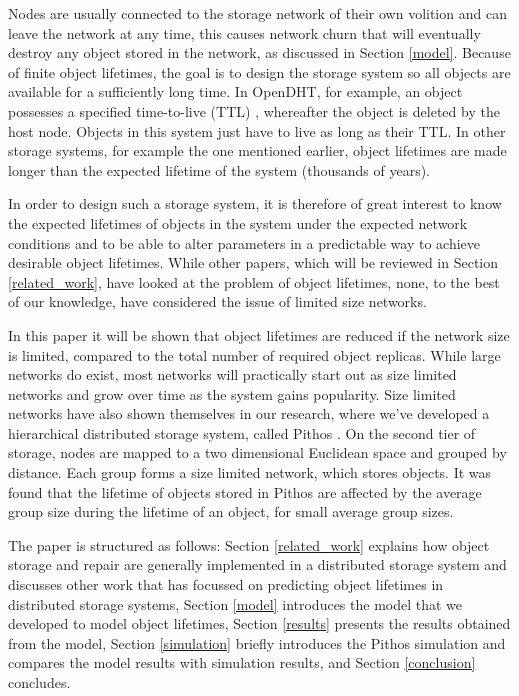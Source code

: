 \documentclass[10pt,a4paper,conference]{IEEEtran}
\begin{document}
Nodes are usually connected to the storage network of their own volition and can leave the network at any time, this causes network churn that will eventually destroy any object stored in the network, as discussed in Section \ref{model}. Because of finite object lifetimes, the goal is to design the storage system so all objects are available for a sufficiently long time. In OpenDHT, for example, an object possesses a specified time-to-live (TTL) \cite{open_dht}, whereafter the object is deleted by the host node. Objects in this system just have to live as long as their TTL. In other storage systems, for example the one mentioned earlier, object lifetimes are made longer than the expected lifetime of the system (thousands of years).

In order to design such a storage system, it is therefore of great interest to know the expected lifetimes of objects in the system under the expected network conditions and to be able to alter parameters in a predictable way to achieve desirable object lifetimes. While other papers, which will be reviewed in Section \ref{related_work}, have looked at the problem of object lifetimes, none, to the best of our knowledge, have considered the issue of limited size networks.

In this paper it will be shown that object lifetimes are reduced if the network size is limited, compared to the total number of required object replicas. While large networks do exist, most networks will practically start out as size limited networks and grow over time as the system gains popularity. Size limited networks have also shown themselves in our research, where we've developed a hierarchical distributed storage system, called Pithos \cite{Pithos_mmve_2011}. On the second tier of storage, nodes are mapped to a two dimensional Euclidean space and grouped by distance. Each group forms a size limited network, which stores objects. It was found that the lifetime of objects stored in Pithos are affected by the average group size during the lifetime of an object, for small average group sizes.

The paper is structured as follows:
%
Section \ref{related_work} explains how object storage and repair are generally implemented in a distributed storage system and discusses other work that has focussed on predicting object lifetimes in distributed storage systems,
%
Section \ref{model} introduces the model that we developed to model object lifetimes,
%
Section \ref{results} presents the results obtained from the model,
%
Section \ref{simulation} briefly introduces the Pithos simulation and compares the model results with simulation results, and
%
Section \ref{conclusion} concludes.
\end{document}
